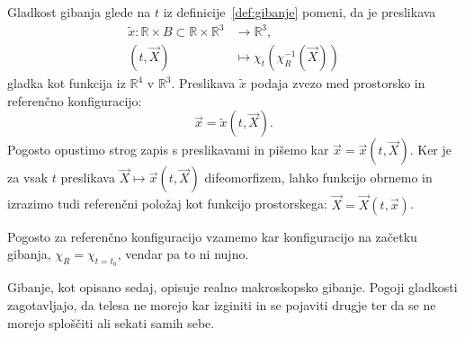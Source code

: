 \documentclass[12pt,a4paper,twoside]{article}
\theoremstyle{definition} %
\theoremstyle{plain} %
\numberwithin{equation}{section}
\newcommand{\R}{\mathbb R}
\newcommand{\vX}{\vec{X}}
\newcommand{\vx}{\vec{x}}
\begin{document}
Gladkost gibanja glede na $t$ iz definicije~\ref{def:gibanje} pomeni, da je
preslikava
\begin{align}
  \tilde{x}\colon \R \times B \subset \R \times \R^3&\to \R^3, \nonumber \\
  (t, \vX) &\mapsto \chi_t(\chi_R^{-1}(\vX))
\end{align}
gladka kot funkcija iz $\R^4$ v $\R^3$.
Preslikava $\tilde x$ podaja zvezo med prostorsko in referenčno konfiguracijo:
\begin{equation}
  \label{eq:pros-ref}
  \vx = \tilde x(t, \vX).
\end{equation}
Pogosto opustimo strog zapis s preslikavami in pišemo kar $\vx = \vx(t, \vX)$.
Ker je za vsak $t$ preslikava $\vX \mapsto \vx(t, \vX)$ difeomorfizem, lahko funkcijo
obrnemo in izrazimo tudi referenčni položaj kot funkcijo prostorskega: $\vX = \vX(t, \vx)$.

Pogosto za referenčno konfiguracijo vzamemo kar konfiguracijo na začetku
gibanja, $\chi_R = \chi_{t=t_0}$, vendar pa to ni nujno.

Gibanje, kot opisano sedaj, opisuje realno makroskopsko gibanje. Pogoji gladkosti zagotavljajo, da
telesa ne morejo kar izginiti in se pojaviti drugje ter da se ne morejo sploščiti ali sekati samih
sebe.
\end{document}
